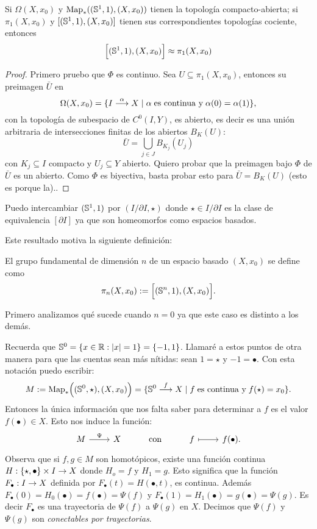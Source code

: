 \documentclass[../../topologia_algebraica]{subfiles}
\begin{document}
\begin{prop}
  Si $\Omega(X,x_0)$ y $\text{Map}_*((\mathbb{S}^1,1),(X,x_0))$ tienen la topolog\'ia compacto-abierta;
  si $\pi_1(X,x_0)$ y $[(\mathbb{S}^1,1),(X,x_0)]$ tienen sus correspondientes topolog\'ias cociente, entonces
  \[
    \Big[(\mathbb{S}^1,1),(X,x_0)\Big] \approx \pi_1(X,x_0)
  \]
\end{prop}
\begin{proof}
  Primero pruebo que $\Phi$ es continuo. Sea $U\subseteq\pi_1(X,x_0)$, entonces su preimagen $\bar{U}$
  en
  \[
    \Omega(X,x_0)=\{I\overset{\alpha}{\longrightarrow} X \mid \alpha \;\text{es continua y}\; \alpha(0)=\alpha(1)\},
  \]
  con la topolog\'ia de subespacio de $C^0(I,Y)$, es abierto, es decir es una uni\'on arbitraria
  de intersecciones finitas de los abiertos $B_K(U)$:
  \[
    \bar{U}=\bigcup_{j\in J}B_{K_j}(U_j)
  \]
  con $K_j\subseteq I$ compacto y $U_j\subseteq Y$ abierto. Quiero probar que la preimagen bajo
  $\Phi$ de $\bar{U}$ es un abierto. Como $\Phi$ es biyectiva, basta probar esto para $\bar{U}=B_K(U)$
  (esto es porque la)..
  
\end{proof}

\begin{nota}
  Puedo intercambiar $(\mathbb{S}^1,1)$ por $(I/\partial I,\star)$ donde $\star\in I/\partial I$ es la clase
  de equivalencia $[\partial I]$ ya que son homeomorfos como espacios basados.
\end{nota}

Este resultado motiva la siguiente definici\'on:
\begin{defin}\label{def:grupo_fundamental_dimension_n}
  El grupo fundamental de dimensi\'on $n$ de un espacio basado $(X,x_0)$ se define como
  \[
    \pi_n(X,x_0):=\Big[(\mathbb{S}^n,1),(X,x_0)\Big].
  \]
\end{defin}

Primero analizamos qu\'e sucede cuando $n=0$ ya que este caso es distinto a los dem\'as.

Recuerda que $\mathbb{S}^0=\{x\in\mathbb{R}: \left| x \right|=1\}=\{-1,1\}$. Llamar\'e a estos puntos de otra manera
para que las cuentas sean m\'as n\'itidas: sean $1=\star$ y $-1=\bullet$. Con esta notaci\'on
puedo escribir:
\[
  M:=\text{Map}_*\Big( (\mathbb{S}^0,\star),(X,x_0) \Big)=
  \{\mathbb{S}^0\overset{f}{\longrightarrow} X \mid f\;\text{es continua y}\; f(\star)=x_0\}.
\]
Entonces la \'unica informaci\'on que nos falta saber para determinar a $f$ es el valor
$f(\bullet)\in X$. Esto nos induce la funci\'on:
\[
  \begin{tikzcd}
    M\arrow[r,"\Psi"] & X & \text{con}
    & f \arrow[r,mapsto] & f(\bullet).
  \end{tikzcd}
\]
Observa que si $f,g\in M$ son homot\'opicos, existe una funci\'on continua
$H:\{\star,\bullet\}\times I\rightarrow X$ donde $H_o=f$ y $H_1=g$. Esto significa que
la funci\'on $F_{\bullet}:I\rightarrow X$ definida por $F_{\bullet}(t)=H(\bullet,t)$, es continua.
Adem\'as $F_{\bullet}(0)=H_0(\bullet)=f(\bullet)=\Psi(f)$ y $F_{\bullet}(1)=H_1(\bullet)=g(\bullet)=\Psi(g)$.
Es decir $F_{\bullet}$ es una trayectoria de $\Psi(f)$ a $\Psi(g)$ en $X$. Decimos
que $\Psi(f)$ y $\Psi(g)$ son \emph{conectables por trayectorias}.
\end{document}
